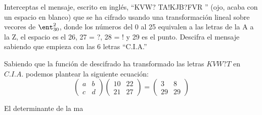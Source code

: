 \begin{problem}[4]
Interceptas el mensaje, escrito en inglés, ``KVW? TA!KJB?FVR '' (ojo, acaba con un espacio en blanco) que se ha cifrado usando una transformación lineal sobre vecores de $\ent_{30}^2$, donde los números del 0 al 25 equivalen a las letras de la A a la Z, el espacio es el 26, 27 = ?, 28 = ! y 29 es el punto. Descifra el mensaje sabiendo que empieza con las 6 letras ``C.I.A.''

\solution
{}

Sabiendo que la función de descifrado ha transformado las letras $KVW? T$ en $C.I.A.$ podemos plantear la siguiente ecuación:
\[
	\left( \begin{array}{cc}
	a & b \\
	c & d
	\end{array} \right)
	\left( \begin{array}{cc}
	10 & 22\\
	21 & 27
	\end{array} \right)
	=
	\left( \begin{array}{cc}
	3 & 8\\
	29 & 29
	\end{array} \right)
\]

El determinante de la ma
\end{problem}

\begin{problem}[5]


\solution
\end{problem}

\begin{problem}[6]


\solution
\end{problem}

\begin{problem}[7]


\solution
\end{problem}

\begin{problem}[8]


\solution
\end{problem}

\begin{problem}[9]


\solution
\end{problem}

\begin{problem}[10]


\solution
\end{problem}

\begin{problem}[11]


\solution
\end{problem}

\begin{problem}[12]


\solution
\end{problem}

\begin{problem}[13]


\solution
\end{problem}